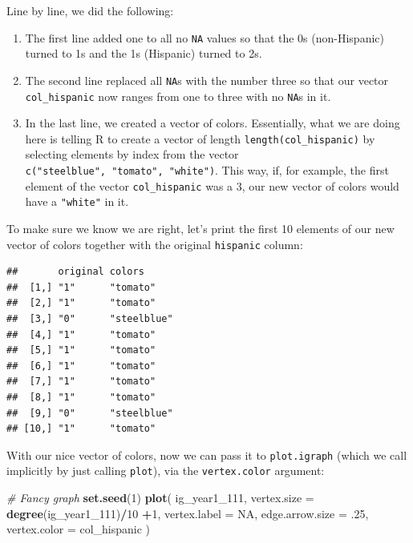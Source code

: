 \documentclass[
]{book}
\newenvironment{Shaded}{\begin{snugshade}}{\end{snugshade}}
\newcommand{\AttributeTok}[1]{\textcolor[rgb]{0.13,0.29,0.53}{#1}}
\newcommand{\CommentTok}[1]{\textcolor[rgb]{0.56,0.35,0.01}{\textit{#1}}}
\newcommand{\ConstantTok}[1]{\textcolor[rgb]{0.56,0.35,0.01}{#1}}
\newcommand{\DecValTok}[1]{\textcolor[rgb]{0.00,0.00,0.81}{#1}}
\newcommand{\FunctionTok}[1]{\textcolor[rgb]{0.13,0.29,0.53}{\textbf{#1}}}
\newcommand{\NormalTok}[1]{#1}
\newcommand{\SpecialCharTok}[1]{\textcolor[rgb]{0.81,0.36,0.00}{\textbf{#1}}}
\begin{document}
Line by line, we did the following:

\begin{enumerate}
\def\labelenumi{\arabic{enumi}.}
\item
  The first line added one to all no \texttt{NA} values so that the 0s (non-Hispanic) turned to 1s and the 1s (Hispanic) turned to 2s.
\item
  The second line replaced all \texttt{NA}s with the number three so that our vector \texttt{col\_hispanic} now ranges from one to three with no \texttt{NA}s in it.
\item
  In the last line, we created a vector of colors. Essentially, what we are doing here is telling R to create a vector of length \texttt{length(col\_hispanic)} by selecting elements by index from the vector \texttt{c("steelblue",\ "tomato",\ "white")}. This way, if, for example, the first element of the vector \texttt{col\_hispanic} was a 3, our new vector of colors would have a \texttt{"white"} in it.
\end{enumerate}

To make sure we know we are right, let's print the first 10 elements of our new vector of colors together with the original \texttt{hispanic} column:

\begin{Shaded}
\end{Shaded}

\begin{verbatim}
##       original colors     
##  [1,] "1"      "tomato"   
##  [2,] "1"      "tomato"   
##  [3,] "0"      "steelblue"
##  [4,] "1"      "tomato"   
##  [5,] "1"      "tomato"   
##  [6,] "1"      "tomato"   
##  [7,] "1"      "tomato"   
##  [8,] "1"      "tomato"   
##  [9,] "0"      "steelblue"
## [10,] "1"      "tomato"
\end{verbatim}

With our nice vector of colors, now we can pass it to \texttt{plot.igraph} (which we call implicitly by just calling \texttt{plot}), via the \texttt{vertex.color} argument:

\begin{Shaded}
\begin{Highlighting}[]
\CommentTok{\# Fancy graph}
\FunctionTok{set.seed}\NormalTok{(}\DecValTok{1}\NormalTok{)}
\FunctionTok{plot}\NormalTok{(}
\NormalTok{  ig\_year1\_111,}
  \AttributeTok{vertex.size     =} \FunctionTok{degree}\NormalTok{(ig\_year1\_111)}\SpecialCharTok{/}\DecValTok{10} \SpecialCharTok{+}\DecValTok{1}\NormalTok{,}
  \AttributeTok{vertex.label    =} \ConstantTok{NA}\NormalTok{,}
  \AttributeTok{edge.arrow.size =}\NormalTok{ .}\DecValTok{25}\NormalTok{,}
  \AttributeTok{vertex.color    =}\NormalTok{ col\_hispanic}
\NormalTok{  )}
\end{Highlighting}
\end{Shaded}
\end{document}
